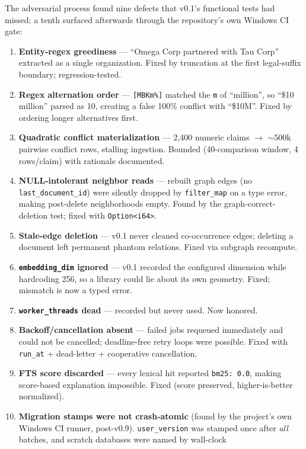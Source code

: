 The adversarial process found nine defects that v0.1's functional tests had
missed; a tenth surfaced afterwards through the repository's own Windows CI
gate:

\begin{enumerate}[itemsep=3pt]
\item \textbf{Entity-regex greediness} --- ``Omega Corp partnered with Tau
Corp'' extracted as a single organization. Fixed by truncation at the first
legal-suffix boundary; regression-tested.
\item \textbf{Regex alternation order} --- \texttt{[MBKm\%]} matched the
\texttt{m} of ``million'', so ``\$10 million'' parsed as 10, creating a false
100\% conflict with ``\$10M''. Fixed by ordering longer alternatives first.
\item \textbf{Quadratic conflict materialization} --- 2,400 numeric claims
$\rightarrow$ ${\sim}500$k pairwise conflict rows, stalling ingestion.
Bounded (40-comparison window, 4 rows/claim) with rationale documented.
\item \textbf{NULL-intolerant neighbor reads} --- rebuilt graph edges (no
\texttt{last\_document\_id}) were silently dropped by \texttt{filter\_map} on
a type error, making post-delete neighborhoods empty. Found by the
graph-correct-deletion test; fixed with \texttt{Option<i64>}.
\item \textbf{Stale-edge deletion} --- v0.1 never cleaned co-occurrence
edges; deleting a document left permanent phantom relations. Fixed via
subgraph recompute.
\item \textbf{\texttt{embedding\_dim} ignored} --- v0.1 recorded the
configured dimension while hardcoding 256, so a library could lie about its
own geometry. Fixed; mismatch is now a typed error.
\item \textbf{\texttt{worker\_threads} dead} --- recorded but never used. Now
honored.
\item \textbf{Backoff/cancellation absent} --- failed jobs requeued
immediately and could not be cancelled; deadline-free retry loops were
possible. Fixed with \texttt{run\_at} + dead-letter + cooperative
cancellation.
\item \textbf{FTS score discarded} --- every lexical hit reported
\texttt{bm25: 0.0}, making score-based explanation impossible. Fixed (score
preserved, higher-is-better normalized).
\item \textbf{Migration stamps were not crash-atomic} (found by the project's
own Windows CI runner, post-v0.9). \texttt{user\_version} was stamped once
after \emph{all} batches, and scratch databases were named by wall-clock

\end{enumerate}
